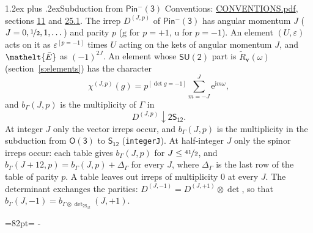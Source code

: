 \documentclass[10pt,a4paper]{article}
\makeatletter
\renewcommand\section{\@startsection{section}{1}{\z@}{-3ex plus -1ex minus -.2ex}%
  {1.2ex plus .2ex}{\normalfont\large\sffamily\bfseries\color{parttitle}}}
\newcommand{\needspace}[1]{\par\penalty-100\begingroup\dimen0=#1\relax\dimen2=\pagegoal
  \advance\dimen2-\pagetotal\ifdim\dimen0>\dimen2\relax\ifdim\dimen2>0pt\vfil\break\fi\fi
  \endgroup}
\numberwithin{equation}{section}
\newcommand{\eltfont}[1]{{\let\sigma\eltsigma\mathelt{#1}}}
\newcommand{\grp}[1]{\mathsf{#1}}
\newcommand{\elt}[1]{\eltfont{#1}}
\newcommand{\ptag}[1]{\mathrm{#1}}
\newcommand{\iverson}[1]{[#1]}
\newcommand{\restr}[2]{#1\!\downarrow#2}
\newcommand{\vv}{\mathbf{v}}
\newcommand{\iunit}{\mathrm{i}}
\newcommand{\expe}{\mathrm{e}}
\newcommand{\irrJp}[2]{D^{(#1,#2)}}
\newcommand{\irrprod}{\otimes}
\newcommand{\barred}[1]{\bar{#1}}
\newcommand{\lift}[1]{\tilde{#1}}
\makeatother
\begin{document}
\section{Subduction from \texorpdfstring{$\grp{Pin^{-}(3)}$}{Pin(3)}}\label{s:subduction_parent}
Conventions: \href{../../CONVENTIONS.pdf}{CONVENTIONS.pdf}, sections \href{../../../rotation/CONVENTIONS.pdf\#conv.11}{11} and \href{../../CONVENTIONS.pdf\#conv.25.1}{25.1}.
\leavevmode\label{n:index.J}\label{n:index.parity}\label{n:irrep.o3}The irrep $\irrJp{J}{p}$ of \href{Pinminus3.pdf}{$\grp{Pin^{-}(3)}$} has angular momentum $J$ ($J = 0, \nicefrac{1}{2}, 1, \dots$) and parity $p$ ($\ptag{g}$ for $p = +1$, $\ptag{u}$ for $p = -1$). An element $(U, \varepsilon)$ acts on it as $\varepsilon^{[p = -1]}$ times $U$ acting on the kets of angular momentum $J$, and $\elt{\barred{E}}$ as $(-1)^{2J}$. \label{n:function.character.parent}\label{n:function.multiplicity}An element whose $\grp{SU(2)}$ part is $\lift{R}_{\vv}(\omega)$ (section~\ref{s:elements}) has the character
\begin{equation}\label{e:chi}\chi^{(J,p)}(g) = p^{\iverson{\det g = -1}}\sum_{m=-J}^{J} \expe^{\iunit m\omega},\end{equation}
and $b_\Gamma(J, p)$ is the multiplicity of $\Gamma$ in
\begin{equation}\label{e:parent}\restr{\irrJp{J}{p}}{\grp{2S_{12}}}.\end{equation}
At integer $J$ only the vector irreps occur, and $b_\Gamma(J, p)$ is the multiplicity in the subduction from $\grp{O(3)}$ to \href{../../../rotation/data/pdf/S12.pdf}{$\grp{S_{12}}$} (\texttt{integerJ}). \label{n:index.increment}At half-integer $J$ only the spinor irreps occur: each table gives $b_\Gamma(J, p)$ for $J \le \nicefrac{41}{2}$, and $b_\Gamma(J + 12, p) = b_\Gamma(J, p) + \Delta_\Gamma$ for every $J$, where $\Delta_\Gamma$ is the last row of the table of parity $p$. A table leaves out irreps of multiplicity 0 at every $J$.
\leavevmode\label{n:operator.determinant.character}The determinant exchanges the parities: $\irrJp{J}{-1} = \irrJp{J}{+1} \irrprod \det$, so that $b_\Gamma(J, -1) = b_{\Gamma \irrprod \det_{\grp{2S_{12}}}}(J, +1)$.
\needspace{82pt}
\end{document}

